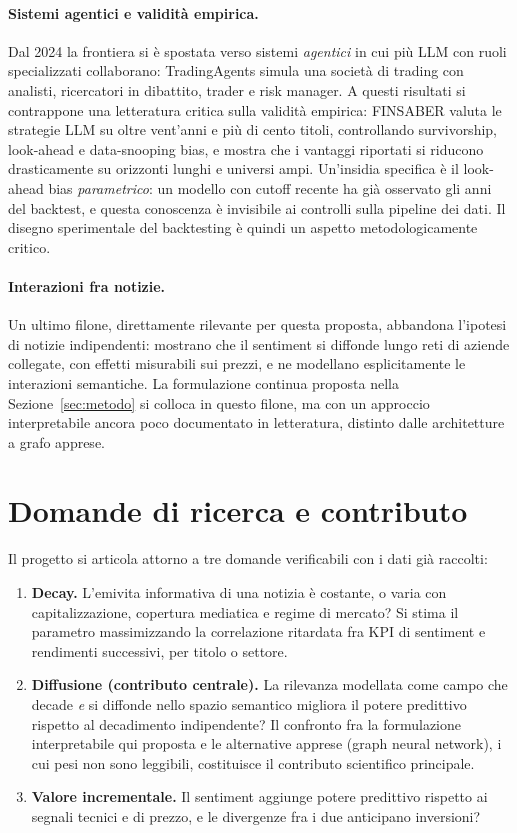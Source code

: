 \documentclass[a4paper,11pt]{article}
\begin{document}
\paragraph{Sistemi agentici e validità empirica.} Dal 2024 la frontiera si è spostata verso sistemi \textit{agentici} in cui più LLM con ruoli specializzati collaborano: TradingAgents \parencite{xiao2025tradingagents} simula una società di trading con analisti, ricercatori in dibattito, trader e risk manager. A questi risultati si contrappone una letteratura critica sulla validità empirica: FINSABER \parencite{li2025finsaber} valuta le strategie LLM su oltre vent'anni e più di cento titoli, controllando survivorship, look-ahead e data-snooping bias, e mostra che i vantaggi riportati si riducono drasticamente su orizzonti lunghi e universi ampi. Un'insidia specifica è il look-ahead bias \emph{parametrico}: un modello con cutoff recente ha già osservato gli anni del backtest, e questa conoscenza è invisibile ai controlli sulla pipeline dei dati. Il disegno sperimentale del backtesting è quindi un aspetto metodologicamente critico.

\paragraph{Interazioni fra notizie.} Un ultimo filone, direttamente rilevante per questa proposta, abbandona l'ipotesi di notizie indipendenti: \textcite{wan2021sentimentdiffusion} mostrano che il sentiment si diffonde lungo reti di aziende collegate, con effetti misurabili sui prezzi, e \textcite{wang2024finin} ne modellano esplicitamente le interazioni semantiche. La formulazione continua proposta nella Sezione~\ref{sec:metodo} si colloca in questo filone, ma con un approccio interpretabile ancora poco documentato in letteratura, distinto dalle architetture a grafo apprese.

\section{Domande di ricerca e contributo}

Il progetto si articola attorno a tre domande verificabili con i dati già raccolti:
\begin{enumerate}\setlength\itemsep{0.1em}
  \item \textbf{Decay.} L'emivita informativa di una notizia è costante, o varia con capitalizzazione, copertura mediatica e regime di mercato? Si stima il parametro massimizzando la correlazione ritardata fra KPI di sentiment e rendimenti successivi, per titolo o settore.
  \item \textbf{Diffusione (contributo centrale).} La rilevanza modellata come campo che decade \emph{e} si diffonde nello spazio semantico migliora il potere predittivo rispetto al decadimento indipendente? Il confronto fra la formulazione interpretabile qui proposta e le alternative apprese (graph neural network), i cui pesi non sono leggibili, costituisce il contributo scientifico principale.
  \item \textbf{Valore incrementale.} Il sentiment aggiunge potere predittivo rispetto ai segnali tecnici e di prezzo, e le divergenze fra i due anticipano inversioni?
\end{enumerate}
\end{document}
